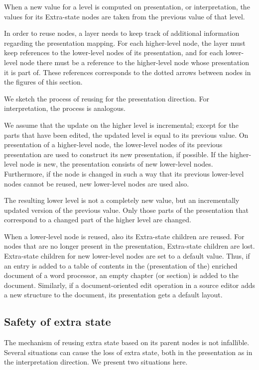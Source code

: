 When a new value for a level is computed on presentation, or interpretation, the values for its Extra-state nodes are taken from the previous value of that level. 

In order to reuse nodes, a layer needs to keep track of additional information regarding the presentation mapping. For each higher-level node, the layer must keep references to the lower-level nodes of its presentation, and for each lower-level node there must be  a reference to the higher-level node whose presentation it is part of. These references corresponds to the dotted arrows between nodes in the figures of this section.

We sketch the process of reusing for the presentation direction. For interpretation, the process is analogous.

We assume that the update on the higher level is incremental; except for the parts that have been edited, the updated level is equal to its previous value.  On presentation of a higher-level node, the lower-level nodes of its previous presentation are used to construct its new presentation, if possible. If the higher-level node is new, the presentation consists of new lower-level nodes. Furthermore, if the node is changed in such a way that its previous lower-level nodes cannot be reused, new lower-level nodes are used also.

The resulting lower level is not a completely new value, but an incrementally updated version of the previous value. Only those parts of the presentation that correspond to a changed part of the higher level are changed. 

When a lower-level node is reused, also its Extra-state children are reused.  For nodes that are no longer present in the presentation, Extra-state children are lost. Extra-state children for new lower-level nodes are set to a default value. Thus, if an entry is added to a table of contents in the (presentation of the) enriched document of a word processor, an empty chapter (or section) is added to the document. Similarly, if a document-oriented edit operation in a source editor adds a new structure to the document, its presentation gets a default layout.


\subsection{Safety of extra state}

The mechanism of reusing extra state based on its parent nodes is not infallible. Several situations can cause the loss of extra state, both in the presentation as in the interpretation direction. We present two situations here.

